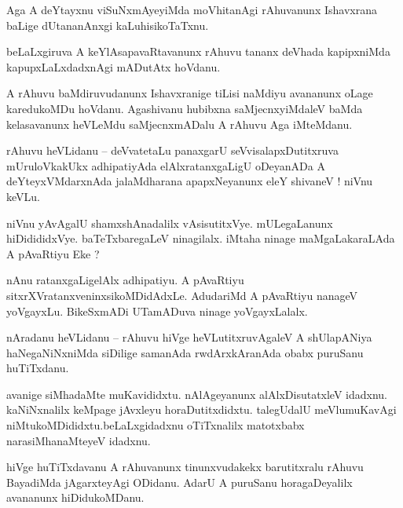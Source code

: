 \documentclass{article}
\begin{document}
\begin{mn}%
Aga A deYtayxnu viSuNxmAyeyiMda moVhitanAgi rAhuvanunx Ishavxrana baLige dUtananAnxgi 
kaLuhisikoTaTxnu.
\end{mn}

\begin{mn}%
beLaLxgiruva A keYlAsapavaRtavanunx rAhuvu tananx deVhada kapipxniMda kapupxLaLxdadxnAgi mADutAtx 
hoVdanu.
\end{mn}

\begin{mn}%
A rAhuvu baMdiruvudanunx Ishavxranige tiLisi naMdiyu avananunx oLage karedukoMDu hoVdanu. 
Agashivanu hubibxna saMjecnxyiMdaleV baMda kelasavanunx heVLeMdu saMjecnxmADalu A rAhuvu Aga 
iMteMdanu.
\end{mn}

\begin{mn}%
rAhuvu heVLidanu -- deVvatetaLu panaxgarU seVvisalapxDutitxruva mUruloVkakUkx adhipatiyAda 
elAlxratanxgaLigU oDeyanADa A deYteyxVMdarxnAda jalaMdharana apapxNeyanunx eleY shivaneV ! niVnu 
keVLu.
\end{mn}

\begin{mn}%
niVnu yAvAgalU shamxshAnadalilx vAsisutitxVye. mULegaLanunx hiDidididxVye. baTeTxbaregaLeV 
ninagilalx. iMtaha ninage maMgaLakaraLAda A pAvaRtiyu Eke ?
\end{mn}

\begin{mn}%
nAnu ratanxgaLigelAlx adhipatiyu. A pAvaRtiyu sitxrXVratanxveninxsikoMDidAdxLe. AdudariMd A 
pAvaRtiyu nanageV yoVgayxLu. BikeSxmADi UTamADuva ninage yoVgayxLalalx.
\end{mn}

\begin{mn}%
nAradanu heVLidanu -- rAhuvu hiVge heVLutitxruvAgaleV A shUlapANiya haNegaNiNxniMda siDilige 
samanAda rwdArxkAranAda obabx puruSanu huTiTxdanu.
\end{mn}

\begin{mn}%
avanige siMhadaMte muKavididxtu. nAlAgeyanunx alAlxDisutatxleV idadxnu. kaNiNxnalilx keMpage 
jAvxleyu horaDutitxdidxtu. talegUdalU meVlumuKavAgi niMtukoMDididxtu.beLaLxgidadxnu oTiTxnalilx 
matotxbabx narasiMhanaMteyeV idadxnu.
\end{mn}

\begin{mn}%
hiVge huTiTxdavanu A rAhuvanunx tinunxvudakekx barutitxralu rAhuvu BayadiMda jAgarxteyAgi ODidanu. 
AdarU A puruSanu horagaDeyalilx avananunx hiDidukoMDanu.
\end{mn}
\end{document}
